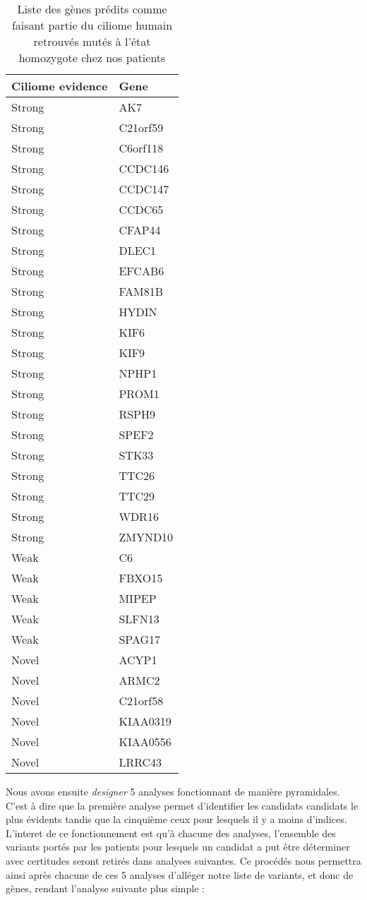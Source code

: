 \documentclass[12pt,twoside]{reedthesis}
\theoremstyle{definition}
\theoremstyle{definition}
\theoremstyle{remark}
\begin{document}
  \begin{longtable}[t]{ll}
  \caption{\label{tab:tabcil}Liste des gènes prédits comme faisant partie du ciliome humain retrouvés mutés à l'état homozygote chez nos patients}\\
  \toprule
  Ciliome evidence & Gene\\
  \midrule
  Strong & AK7\\
  Strong & C21orf59\\
  Strong & C6orf118\\
  Strong & CCDC146\\
  Strong & CCDC147\\
  \addlinespace
  Strong & CCDC65\\
  Strong & CFAP44\\
  Strong & DLEC1\\
  Strong & EFCAB6\\
  Strong & FAM81B\\
  \addlinespace
  Strong & HYDIN\\
  Strong & KIF6\\
  Strong & KIF9\\
  Strong & NPHP1\\
  Strong & PROM1\\
  \addlinespace
  Strong & RSPH9\\
  Strong & SPEF2\\
  Strong & STK33\\
  Strong & TTC26\\
  Strong & TTC29\\
  \addlinespace
  Strong & WDR16\\
  Strong & ZMYND10\\
  Weak & C6\\
  Weak & FBXO15\\
  Weak & MIPEP\\
  \addlinespace
  Weak & SLFN13\\
  Weak & SPAG17\\
  Novel & ACYP1\\
  Novel & ARMC2\\
  Novel & C21orf58\\
  \addlinespace
  Novel & KIAA0319\\
  Novel & KIAA0556\\
  Novel & LRRC43\\
  \bottomrule
  \end{longtable}
  
  \newpage
  
  Nous avons ensuite \emph{designer} 5 analyses fonctionnant de manière
  pyramidales. C'est à dire que la première analyse permet d'identifier
  les candidats candidats le plus évidents tandis que la cinquième ceux
  pour lesquels il y a moins d'indices. L'interet de ce fonctionnement est
  qu'à chacune des analyses, l'ensemble des variants portés par les
  patients pour lesquels un candidat a put être déterminer avec certitudes
  seront retirés dans analyses suivantes. Ce procédés nous permettra ainsi
  après chacune de ces 5 analyses d'alléger notre liste de variants, et
  donc de gènes, rendant l'analyse suivante plus simple :
  
\end{document}
